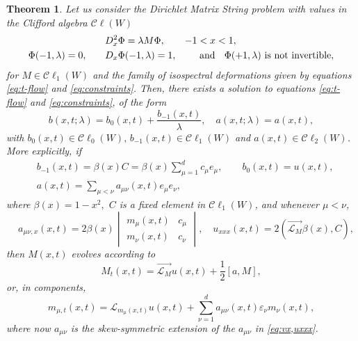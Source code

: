 \documentclass[10pt,a4paper]{article}
\numberwithin{equation}{section}
\theoremstyle{plain}
\newtheorem{theorem}{Theorem}[section]
\theoremstyle{definition}
\renewcommand{\epsilon}{\varepsilon}
\newcommand\Cl{\mathcal{C}\ell}
\newcommand{\InMf}{\stackrel{\rightarrow}{\mathcal{L}_{M}}}
\renewcommand{\l}{\lambda}
\begin{document}
\begin{theorem}
Let us consider the Dirichlet Matrix String problem with values in the Clifford algebra $\Cl(W)$
\begin{align} 
&D_x^2 \Phi=\lambda M \Phi, \qquad   -1<x<1,  \\
\Phi(-1, \l)=0,  \qquad &D_x\Phi(-1,\l)=1, \qquad \text{ and \hspace{0.1cm} $\Phi(+1,\lambda)$ is not invertible}, 
\end{align} 
for $M\in \Cl_1(W)$ and the family of isospectral deformations given by equations \eqref{eq:t-flow} and 
\eqref{eq:constraints}.  Then, there exists a solution to equations \eqref{eq:t-flow} and 
\eqref{eq:constraints}, of the form  
\begin{equation} \label{eq:EB}
b(x,t; \lambda)=b_0(x,t)+\frac{b_{-1}(x,t)}{\lambda}, \quad a(x,t; \lambda)=a(x,t), 
\end{equation} 
with $b_0(x,t) \in \Cl_0(W), \, b_{-1}(x,t)\in \Cl_1(W)$ and $a(x,t)\in \Cl_2(W)$.  More explicitly, if 
\begin{align}
&b_{-1}(x,t)=\beta(x) C=\beta(x)\sum_{\mu=1}^d c_\mu e_\mu,\qquad b_0(x,t)=u(x,t),\\
&      a(x,t)=\sum_{\mu<\nu} a_{\mu\nu }(x,t) e_\mu e_\nu, \hspace{3cm}
\end{align}
where $\beta(x)=1-x^2,$ $C$ is a fixed element in $\Cl_1(W)$, and whenever $\mu<\nu$, 
\begin{equation} \label{eq:vx,uxxx}
 \quad a_{\mu\nu,x}(x,t)=2\beta(x)\begin{vmatrix}m_\mu(x,t)&c_\mu\\ m_\nu(x,t)&c_\nu \end{vmatrix}, \quad u_{xxx}(x,t)=2(\InMf \beta(x), C), 
\end{equation} 
then $M(x,t)$ evolves according to 
\begin{equation} \label{eq:Cliffbeam}
M_t(x,t)=\InMf u(x,t)+\frac12[a,M], 
\end{equation} 
or, in components, 
\begin{equation} \label{eq:Cliffbeamcomp}
m_{\mu,t}(x,t)=\mathcal{L}_{m_\mu(x,t)}u(x,t)+\sum_{\nu=1}^d  a_{\mu\nu}(x,t)\epsilon_\nu m_\nu(x,t),   
\end{equation} 
 where  now $a_{\mu\nu}$ is the skew-symmetric extension of the $a_{\mu \nu}$ in \autoref{eq:vx,uxxx}.   
\end{theorem} 
\end{document}

